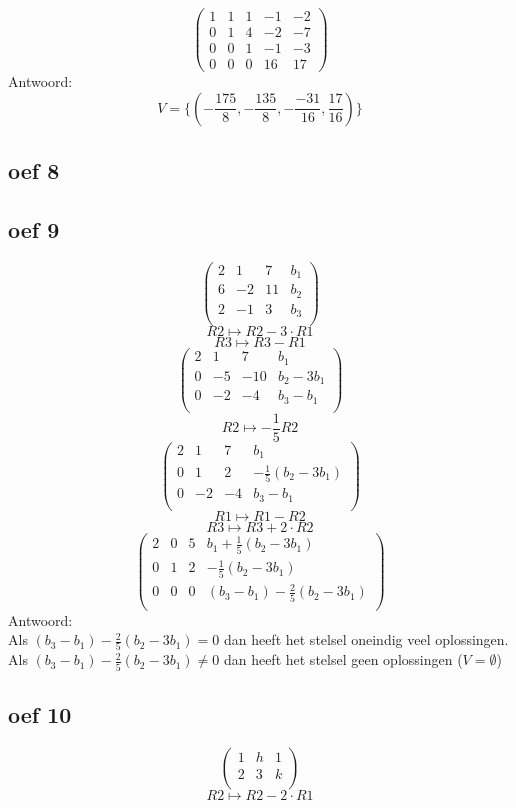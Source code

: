\documentclass[10pt,a4paper]{article}
\begin{document}
\[
\begin{pmatrix}
1 & 1 & 1 & -1 & -2\\
0 & 1 & 4 & -2 & -7\\
0 & 0 & 1 & -1 & -3\\
0 & 0 & 0 & 16 & 17
\end{pmatrix}
\]
Antwoord:
\[
V = \{(-\frac{175}{8},-\frac{135}{8}, -\frac{-31}{16}, \frac{17}{16})\}
\]
\subsection*{oef 8}

\subsection*{oef 9}
\[
\begin{pmatrix}
2 &  1 &  7 & b_1\\
6 & -2 & 11 & b_2 \\
2 & -1 &  3 & b_3\\
\end{pmatrix}
\]
\[ R2 \longmapsto R2 -3\cdot R1\]
\[ R3 \longmapsto R3 - R1\]
\[
\begin{pmatrix}
2 &  1 &  7 & b_1\\
0 & -5 & -10& b_2-3b_1 \\
0 & -2 &  -4& b_3-b_1\\
\end{pmatrix}
\]
\[ R2 \longmapsto -\frac{1}{5} R2\]
\[
\begin{pmatrix}
2 &  1 &  7 & b_1\\
0 &  1 &  2 & -\frac{1}{5}(b_2-3b_1) \\
0 & -2 &  -4& b_3-b_1\\
\end{pmatrix}
\]
\[ R1 \longmapsto R1 - R2\]
\[ R3 \longmapsto R3 + 2 \cdot	R2\]
\[
\begin{pmatrix}
2 &  0 &  5 & b_1 + \frac{1}{5}(b_2-3b_1)\\
0 &  1 &  2 & -\frac{1}{5}(b_2-3b_1) \\
0 &  0 &  0 & (b_3-b_1) - \frac{2}{5}(b_2-3b_1)\\
\end{pmatrix}
\]
Antwoord:\\
Als $(b_3-b_1) - \frac{2}{5}(b_2-3b_1) = 0$ dan heeft het stelsel oneindig veel oplossingen.
Als $(b_3-b_1) - \frac{2}{5}(b_2-3b_1) \neq 0$ dan heeft het stelsel geen oplossingen ($V=\emptyset$)

\subsection*{oef 10}
\[
\begin{pmatrix}
1 & h & 1\\
2 & 3 & k\\
\end{pmatrix}
\]
\[ R2 \longmapsto R2 - 2 \cdot R1\]
\end{document}
